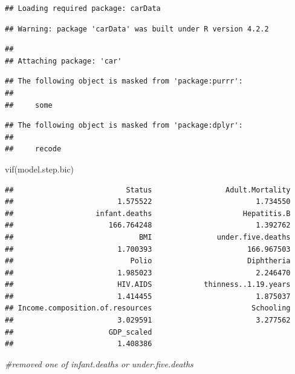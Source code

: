 \documentclass[
]{article}
\newenvironment{Shaded}{\begin{snugshade}}{\end{snugshade}}
\newcommand{\CommentTok}[1]{\textcolor[rgb]{0.56,0.35,0.01}{\textit{#1}}}
\newcommand{\FunctionTok}[1]{\textcolor[rgb]{0.00,0.00,0.00}{#1}}
\newcommand{\NormalTok}[1]{#1}
\begin{document}
\begin{verbatim}
## Loading required package: carData
\end{verbatim}

\begin{verbatim}
## Warning: package 'carData' was built under R version 4.2.2
\end{verbatim}

\begin{verbatim}
## 
## Attaching package: 'car'
\end{verbatim}

\begin{verbatim}
## The following object is masked from 'package:purrr':
## 
##     some
\end{verbatim}

\begin{verbatim}
## The following object is masked from 'package:dplyr':
## 
##     recode
\end{verbatim}

\begin{Shaded}
\begin{Highlighting}[]
\FunctionTok{vif}\NormalTok{(model.step.bic)}
\end{Highlighting}
\end{Shaded}

\begin{verbatim}
##                          Status                 Adult.Mortality 
##                        1.575522                        1.734550 
##                   infant.deaths                     Hepatitis.B 
##                      166.764248                        1.392762 
##                             BMI               under.five.deaths 
##                        1.700393                      166.967503 
##                           Polio                      Diphtheria 
##                        1.985023                        2.246470 
##                        HIV.AIDS            thinness..1.19.years 
##                        1.414455                        1.875037 
## Income.composition.of.resources                       Schooling 
##                        3.029591                        3.277562 
##                      GDP_scaled 
##                        1.408386
\end{verbatim}

\begin{Shaded}
\begin{Highlighting}[]
\CommentTok{\#removed one of infant.deaths or under.five.deaths}
\end{Highlighting}
\end{Shaded}
\end{document}
